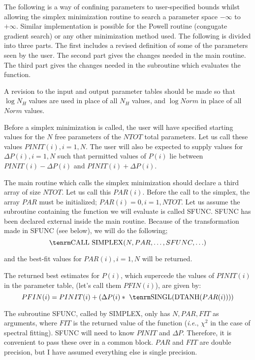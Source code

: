 \vskip 18pt

The following is a way of confining parameters to user-specified
bounds whilst allowing the simplex minimization routine
to search a parameter space $- \infty$ to $+ \infty$.  
Similar implementation is possible for the Powell routine (congugate
gradient search) or any other minimization method used.
The following is divided into three parts.  The first includes
a revised definition of some of the parameters seen by the
user.  The second part gives the changes needed in the main routine.
The third part gives the changes needed in the subroutine which
evaluates the function.

\noindent{}

A revision to the input and output parameter tables should be made
so that $\log N_H$ values are used in place of all $N_H$ values, and
$\log Norm$ in place of all $Norm$ values.

Before a simplex minimization is called, the user will have specified starting
values for the $N$ free parameters of the $NTOT$ total parameters.
Let us call these values $PINIT(i), i=1,N$.  The user will also
be expected to supply values for $\Delta P(i), i=1,N$ such
that permitted values of $P(i)$ lie between $PINIT(i) - \Delta P(i)$
and $PINIT(i) + \Delta P(i)$.

\noindent{}

The main routine which calls the simplex minimization should declare a third array of
size $NTOT$.  Let us call this $PAR(i)$.
Before the call to the simplex, the array $PAR$ must be initialized;
$PAR(i)=0, i=1,NTOT$.
Let us assume the subroutine containing the function we will evaluate
is called SFUNC.  SFUNC has been declared external inside the main
routine.  Because of the transformation made in SFUNC (see below),
we will do the following;
$${\rm CALL~SIMPLEX}(N,PAR,\ldots,SFUNC,\ldots)$$

\noindent
and the best-fit values for $PAR(i),i=1,N$ will be returned.

The returned best estimates for $P(i)$,
which supercede the values of $PINIT(i)$ in the parameter table,
(let's call them $PFIN(i)$), are given by:
$$PFIN(i) = PINIT(i) + ( \Delta P(i) \ast~{\rm  SINGL(DTANH}(PAR(i))))$$

\noindent{}

The subroutine SFUNC, called by SIMPLEX, only has $N, PAR, FIT$ as
arguments, where $FIT$ is the returned value of the function ({\it i.e.},
$\chi^2$ in the case of spectral fitting).  SFUNC will need to know
$PINIT$ and $\Delta P$. Therefore, it is convenient 
to pass these over in a common block.  $PAR$ and $FIT$ are
double precision, but I have assumed everything else is single
precision.

